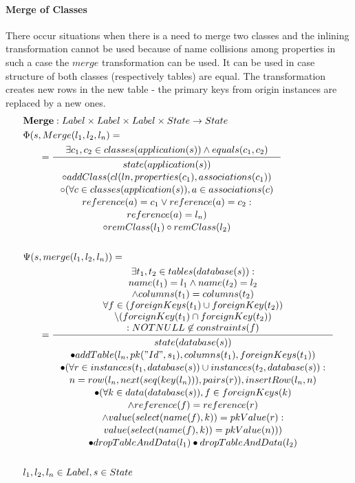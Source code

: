 \documentclass[11pt]{article}
\begin{document}
\paragraph{Merge of Classes} There occur situations when there is a need to merge two classes and the inlining transformation cannot be used because of name collisions among properties in such a case the $merge$ transformation can be used. It can be used in case structure of both classes (respectively tables) are equal. The transformation creates new rows in the new table - the primary keys from origin instances are replaced by a new ones.
\begin{align*}
&	\mathbf{Merge} : Label \times Label \times Label \times State \rightarrow State \\
&	\Phi(s, Merge(l_1, l_2, l_n) = \\
& \;\;\;\;\;\; = \inference{
		\exists c_1, c_2 \in classes(application(s)) \wedge 
		equals(c_1, c_2)}{\begin{gathered}
			state(application(s)) \\ \circ addClass(cl(ln, properties(c_1), associations(c_1)) \\
			\circ (\forall c \in classes (application(s)), a \in associations(c) \\
			reference(a) = c_1 \vee reference(a) = c_2 : \\
			reference(a) = l_n) \\
			\circ remClass(l_1) \circ remClass(l_2) \end{gathered}}
 \\\\
&	\Psi(s, merge(l_1, l_2, l_n)) = \\
& \;\;\;\;\;\; = \inference{\exists t_1, t_2 \in tables(database(s)) : \\ name(t_1) = l_1 \wedge name(t_2) = l_2 \\ \wedge columns(t_1) = columns(t_2)\\
\forall f \in (foreignKeys(t_1) \cup foreignKey(t_2)) \\ \setminus (foreignKey(t_1) \cap foreignKey(t_2)) \\ : NOTNULL \not \in constraints(f)  }{\begin{gathered}
	state(database(s)) \\ \bullet addTable(l_n, pk("Id", s_1), columns(t_1), foreignKeys(t_1)) \\ 
\bullet (\forall r \in instances(t_1, database(s)) \cup instances(t_2, database(s)) :  \\ n =  row(l_n, next(seq(key(l_n))), pairs(r)), insertRow(l_n, n) \\ 
\bullet (\forall k \in data(database(s)), f \in foreignKeys(k) \\ \wedge reference(f) = reference(r) \\ \wedge value(select(name(f), k)) = pkValue(r) : \\value(select(name(f), k)) = pkValue(n))) \\  \bullet dropTableAndData(l_1) \bullet dropTableAndData(l_2)
 \end{gathered}} \\\\
 & l_1, l_2, l_n \in Label, s \in State
\end{align*}
\end{document}
